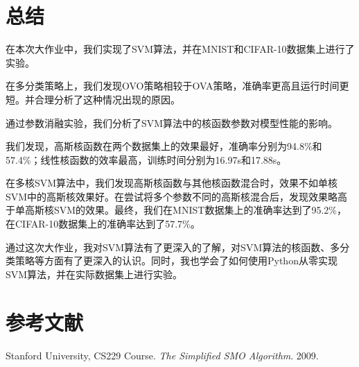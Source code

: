 \documentclass[a4paper]{article}
\begin{document}
\section{总结}
在本次大作业中，我们实现了SVM算法，并在MNIST和CIFAR-10数据集上进行了实验。

在多分类策略上，我们发现OVO策略相较于OVA策略，准确率更高且运行时间更短。并合理分析了这种情况出现的原因。

通过参数消融实验，我们分析了SVM算法中的核函数参数对模型性能的影响。

我们发现，高斯核函数在两个数据集上的效果最好，准确率分别为94.8\%和57.4\%；线性核函数的效率最高，训练时间分别为16.97s和17.88s。

在多核SVM算法中，我们发现高斯核函数与其他核函数混合时，效果不如单核SVM中的高斯核效果好。在尝试将多个参数不同的高斯核混合后，发现效果略高于单高斯核SVM的效果。最终，我们在MNIST数据集上的准确率达到了95.2\%，在CIFAR-10数据集上的准确率达到了57.7\%。 

通过这次大作业，我对SVM算法有了更深入的了解，对SVM算法的核函数、多分类策略等方面有了更深入的认识。同时，我也学会了如何使用Python从零实现SVM算法，并在实际数据集上进行实验。

\section{参考文献}

\begingroup
\renewcommand{\section}[1]{}
\begin{thebibliography}{9}
    Stanford University, CS229 Course. 
    \textit{The Simplified SMO Algorithm}. 
    2009.
\end{thebibliography}
\endgroup
\end{document}
